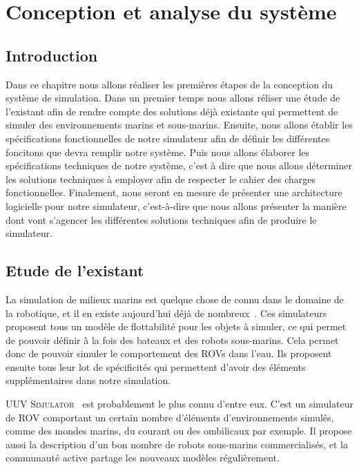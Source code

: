 \chapter{Conception et analyse du système}
    \label{chapitre:systeme}

    \section{Introduction}

        Dans ce chapitre nous allons réaliser les premières étapes de la conception du système de simulation. Dans un premier temps nous allons réliser une étude de l'existant afin de rendre compte des solutions déjà existante qui permettent de simuler des environnements marins et sous-marins. Ensuite, nous allons établir les spécifications fonctionnelles de notre simulateur afin de définir les différentes foncitons que devra remplir notre système. Puis nous allons élaborer les spécifications techniques de notre système, c'est à dire que nous allons déterminer les solutions techniques à employer afin de respecter le cahier des charges fonctionnelles. Finalement, nous seront en mesure de présenter une architecture logicielle pour notre simulateur, c'est-à-dire que nous allons présenter la manière dont vont s'agencer les différentes solutions techniques afin de produire le simulateur.

    \section{Etude de l'existant}

        La simulation de milieux marins est quelque chose de connu dans le domaine de la robotique, et il en existe aujourd'hui déjà de nombreux~\cite{Manhaes_2016, bingham19toward, MARS, Rock}. Ces simulateurs proposent tous un modèle de flottabilité pour les objets à simuler, ce qui permet de pouvoir définir à la fois des bateaux et des robots sous-marins. Cela permet donc de pouvoir simuler le comportement des \gls{ROV}s dans l'eau. Ils proposent ensuite tous leur lot de spécificités qui permettent d'avoir des éléments supplémentaires dans notre simulation.
        
        \textsc{UUV Simulator}~\cite{Manhaes_2016} est probablement le plus connu d'entre eux. C'est un simulateur de \gls{ROV} comportant un certain nombre d'éléments d'environnements simulés, comme des mondes marins, du courant ou des ombilicaux par exemple. Il propose aussi la description d'un bon nombre de robots sous-marins commercialisés, et la communauté active partage les nouveaux modèles régulièrement.
        

